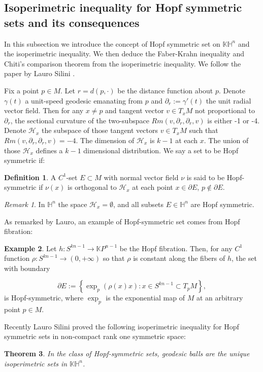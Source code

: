 \documentclass{amsart}
\numberwithin{equation}{section}
\theoremstyle{plain}
\newtheorem{theorem}{Theorem}[section]
\theoremstyle{definition}
\newtheorem{definition}[theorem]{Definition}
\newtheorem{example}[theorem]{Example}
\theoremstyle{remark}
\newtheorem{remark}{Remark}[section]
\def\KK {\mathbb{K}}
\def\HH {\mathbb{H}}
\begin{document}
\subsection{Isoperimetric inequality for Hopf symmetric sets and its consequences}
In this subsection we introduce the concept of Hopf symmetric set on $\KK\HH^n$ and the isoperimetric inequality. We then deduce the Faber-Krahn inequality and Chiti's comparison theorem from the isoperimetric inequality. We follow the paper by Lauro Silini \cite{silini2024approaching}.
\par Fix a point $p \in M$. Let $r= d(p,\cdot)$ be the distance function about $p$. Denote $\gamma(t)$ a unit-speed geodesic emanating from $p$ and  $\partial_r:= \gamma'(t)$ the unit radial vector field. Then for any $x\neq p$ and tangent vector $v\in T_xM$ not proportional to $\partial_r$, the sectional curvature of the two-subspace $Rm(v,\partial_r, \partial_r,v)$ is either -1 or -4. Denote $\mathcal{H}_x$ the subspace of those tangent vectors $v\in T_{x}M$ such that  $Rm(v,\partial_r, \partial_r,v)= -4$. The dimension of $\mathcal{H}_x$ is $k-1$ at each $x$. The union of those $\mathcal{H}_x$ defines a $k-1$ dimensional distribution. We say a set to be Hopf symmetric if:
\begin{definition}\label{DefHopfSymmetricSets}
   A $C^1$-set $E \subset M$ with normal vector field $\nu$ is said to be Hopf-symmetric if $\nu(x)$ is orthogonal to $\mathcal{H}_x$ at each point $x \in \partial E$, $p \notin \partial E$.
\end{definition}
\begin{remark}
    In $\HH^n$ the space $\mathcal{H}_x = \emptyset$, and all subsets $E \in \HH^n$ are Hopf symmetric.
\end{remark}

As remarked by Lauro, an example of Hopf-symmetric set comes from Hopf fibration:
\begin{example}
         Let $h: S^{kn-1} \rightarrow \mathbb{K} P^{n-1}$ be the Hopf fibration. Then, for any $C^1$ function $\rho: S^{kn-1} \rightarrow(0,+\infty)$ so that $\rho$ is constant along the fibers of $h$, the set with boundary

$$
\partial E:=\left\{\exp _p(\rho(x) x): x \in S^{kn-1} \subset T_p M\right\},
$$
is Hopf-symmetric, where $\exp _p$ is the exponential map of $M$ at an arbitrary point $p \in M$.
\end{example}

\par Recently Lauro Silini proved the following isoperimetric inequality for Hopf symmetric sets in non-compact rank one symmetric space\cite{silini2024approaching}:
\begin{theorem}
    In the class of Hopf-symmetric sets, geodesic balls are the unique isoperimetric sets in $\KK\HH^n$.
\end{theorem}
\end{document}
